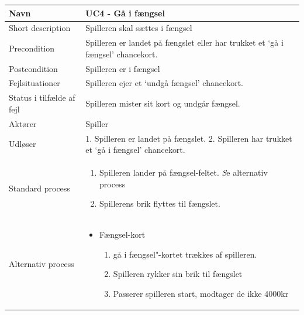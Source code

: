 \begin{center}
\begin{longtable}{|l|p{11cm}|}
\hline
Navn &  UC4 - Gå i fængsel\\
\hline
Short description & Spilleren skal sættes i fængsel \\
\hline
Precondition & Spilleren er landet på fængslet eller har trukket et ‘gå i fængsel’ chancekort. \\
\hline
Postcondition & Spilleren er i fængsel \\
\hline
Fejlsituationer & Spilleren ejer et ‘undgå fængsel’ chancekort. \\
\hline
Status i tilfælde af fejl & Spilleren mister sit kort og undgår fængsel. \\
\hline
Aktører & Spiller \\
\hline
Udløser & 1. Spilleren er landet på fængslet.
2. Spilleren har trukket et ‘gå i fængsel’ chancekort.
 \\
\hline
Standard process &  
\begin{minipage}[t]{1\textwidth}
  \begin{enumerate}
      \item Spilleren lander på fængsel-feltet.\newline
      \emph Se alternativ process\
      \item Spillerens brik flyttes til fængslet.
     \vspace{0.5cm}
  \end{enumerate} 
  \end{minipage}
\\
\hline
Alternativ process & 
\begin{minipage}[t]{1\textwidth}
 \begin{itemize}
     \item Fængsel-kort
     \begin{enumerate}
         \item gå i fængsel"-kortet trækkes af spilleren.
         \item Spilleren rykker sin brik til fængslet
         \item Passerer spilleren start, modtager de ikke 4000kr \
     \end{enumerate}
 \end{itemize}
\end{minipage}

\\
\hline
\end{longtable}
\end{center}



